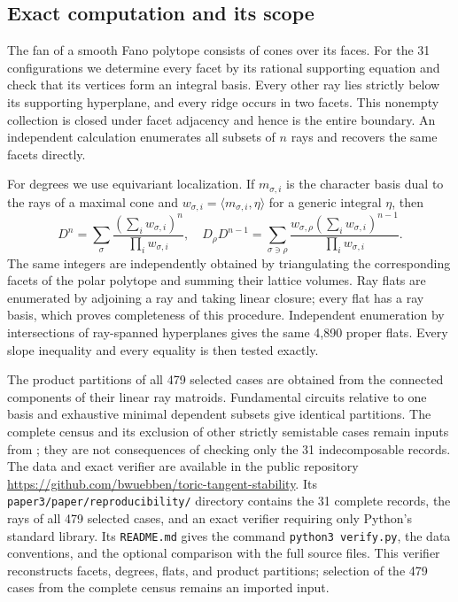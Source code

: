 \documentclass[11pt]{amsart}
\theoremstyle{definition}
\theoremstyle{remark}
\begin{document}


\subsection{Exact computation and its scope}
The fan of a smooth Fano polytope consists of cones over its faces.
For the 31 configurations we determine every facet by its rational
supporting equation and check that its vertices form an integral basis.
Every other ray lies strictly below its supporting hyperplane, and
every ridge occurs in two facets. This nonempty collection is closed
under facet adjacency and hence is the entire boundary. An independent
calculation enumerates all subsets of $n$ rays and recovers the same
facets directly.

For degrees we use equivariant localization. If $m_{\sigma,i}$ is
the character basis dual to the rays of a maximal cone and
$w_{\sigma,i}=\langle m_{\sigma,i},\eta\rangle$ for a generic
integral $\eta$, then
\[
 D^n=\sum_\sigma\frac{(\sum_iw_{\sigma,i})^n}{\prod_iw_{\sigma,i}},
 \quad
 D_\rho D^{n-1}=
 \sum_{\sigma\ni\rho}
 \frac{w_{\sigma,\rho}(\sum_iw_{\sigma,i})^{n-1}}
      {\prod_iw_{\sigma,i}}.
\]
The same integers are independently obtained by triangulating the
corresponding facets of the polar polytope and summing their lattice
volumes. Ray flats are enumerated by adjoining a ray and taking linear
closure; every flat has a ray basis, which proves completeness of this
procedure. Independent enumeration by intersections of ray-spanned
hyperplanes gives the same 4,890 proper flats. Every slope inequality
and every equality is then tested exactly.

The product partitions of all 479 selected cases are obtained from
the connected components of their linear ray matroids. Fundamental
circuits relative to one basis and exhaustive minimal dependent
subsets give identical partitions. The complete census and its
exclusion of other strictly semistable cases remain inputs from
\cite{Wuebben}; they are not consequences of checking only the 31
indecomposable records. The data and exact verifier are available in the
public repository
\url{https://github.com/bwuebben/toric-tangent-stability}.
Its \texttt{paper3/paper/reproducibility/} directory contains the
31 complete records, the rays of all 479 selected cases, and an exact
verifier requiring only Python's standard library. Its \texttt{README.md}
gives the command \texttt{python3 verify.py}, the data conventions, and
the optional comparison with the full source files. This verifier
reconstructs facets, degrees, flats, and product partitions; selection
of the 479 cases from the complete census remains an imported input.
\end{document}
